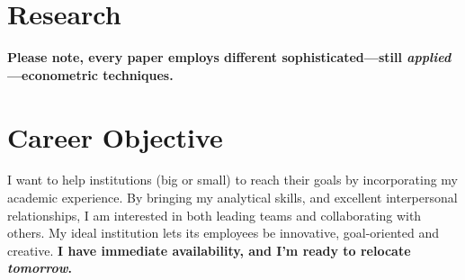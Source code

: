 \documentclass[letterpaper]{article}
\begin{document}
{}

\section*{Research}

{\bf Please note, every paper employs different sophisticated---still \emph{applied}---econometric techniques.}

{}



\section*{Career Objective}

I want to help institutions (big or small) to reach their goals by incorporating my academic experience. By bringing my analytical skills, and excellent interpersonal relationships, I am interested in both leading teams and collaborating with others. My ideal institution lets its employees be innovative, goal-oriented and creative. {\bf I have immediate availability, and I'm ready to relocate \emph{tomorrow}.}

\bigskip
\end{document}
